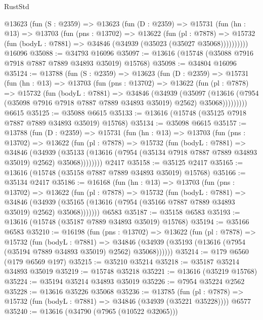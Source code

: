 \begin{lexlean}{RustStd}
\begin{coremodule}
    @13623
      (fun (S : @2359) =>
      @13623
        (fun (D : @2359) =>
        @15731
          (fun (hn : @13) =>
          @13703
            (fun (pns : @13702) =>
            @13622
              (fun (pl : @7878) =>
              @15732 (fun (bodyL : @7881) => @34846 (@34939 (@35023 (@35027 @35068))))))))))
    @16096
@35088 := @34793 @16096
@35097 := @13616 (@15748 (@35088 @7916 @7918 @7887 @7889 @34893 @35019) @15768)
@35098 := @34804 @16096
@35124 := @13788
    (fun (S : @2359) =>
    @13623
      (fun (D : @2359) =>
      @15731
        (fun (hn : @13) =>
        @13703
          (fun (pns : @13702) =>
          @13622
            (fun (pl : @7878) =>
            @15732
              (fun (bodyL : @7881) =>
              @34846
                (@34939
                  (@35097
                    (@13616
                      (@7954 (@35098 @7916 @7918 @7887 @7889 @34893 @35019) @2562)
                      @35068)))))))))
    @6615
@35125 := @35088 @6615
@35133 := @13616 (@15748 (@35125 @7918 @7887 @7889 @34893 @35019) @15768)
@35134 := @35098 @6615
@35157 := @13788
    (fun (D : @2359) =>
    @15731
      (fun (hn : @13) =>
      @13703
        (fun (pns : @13702) =>
        @13622
          (fun (pl : @7878) =>
          @15732
            (fun (bodyL : @7881) =>
            @34846
              (@34939
                (@35133
                  (@13616 (@7954 (@35134 @7918 @7887 @7889 @34893 @35019) @2562) @35068))))))))
    @2417
@35158 := @35125 @2417
@35165 := @13616 (@15748 (@35158 @7887 @7889 @34893 @35019) @15768)
@35166 := @35134 @2417
@35186 := @16168
    (fun (hn : @13) =>
    @13703
      (fun (pns : @13702) =>
      @13622
        (fun (pl : @7878) =>
        @15732
          (fun (bodyL : @7881) =>
          @34846
            (@34939 (@35165 (@13616 (@7954 (@35166 @7887 @7889 @34893 @35019) @2562) @35068)))))))
    @6583
@35187 := @35158 @6583
@35193 := @13616 (@15748 (@35187 @7889 @34893 @35019) @15768)
@35194 := @35166 @6583
@35210 := @16198
    (fun (pns : @13702) =>
    @13622
      (fun (pl : @7878) =>
      @15732
        (fun (bodyL : @7881) =>
        @34846 (@34939 (@35193 (@13616 (@7954 (@35194 @7889 @34893 @35019) @2562) @35068))))))
@35214 := @179 @6560 (@179 @6569 @197)
@35215 := @35210 @35214
@35218 := @35187 @35214 @34893 @35019
@35219 := @15748 @35218
@35221 := @13616 (@35219 @15768)
@35224 := @35194 @35214 @34893 @35019
@35226 := @7954 @35224 @2562
@35228 := @13616 @35226 @35068
@35236 := @13785
    (fun (pl : @7878) => @15732 (fun (bodyL : @7881) => @34846 (@34939 (@35221 @35228))))
    @6577
@35240 := @13616 (@34790 (@7965 (@10522 @32065)))

\end{coremodule}
\end{lexlean}
